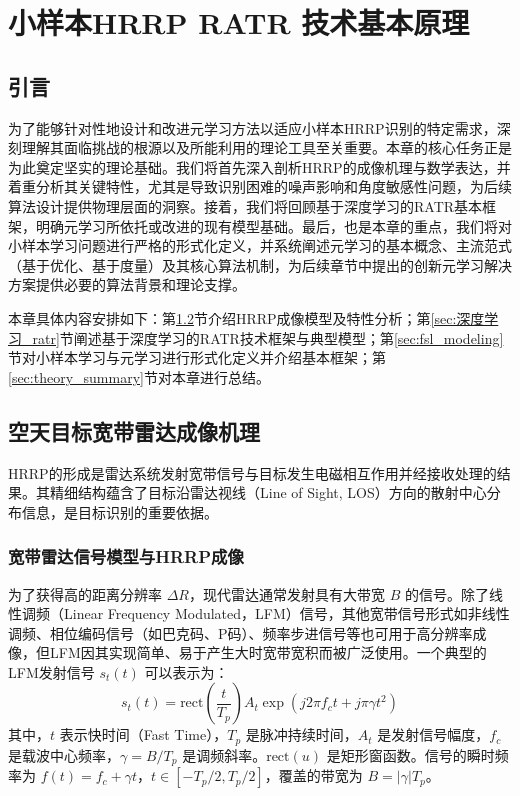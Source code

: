 \chapter{小样本HRRP RATR 技术基本原理}
\label{chap:theory}

\section{引言}
\label{sec:theory_intro}

为了能够针对性地设计和改进元学习方法以适应小样本HRRP识别的特定需求，深刻理解其面临挑战的根源以及所能利用的理论工具至关重要。本章的核心任务正是为此奠定坚实的理论基础。我们将首先深入剖析HRRP的成像机理与数学表达，并着重分析其关键特性，尤其是导致识别困难的噪声影响和角度敏感性问题，为后续算法设计提供物理层面的洞察。接着，我们将回顾基于深度学习的RATR基本框架，明确元学习所依托或改进的现有模型基础。最后，也是本章的重点，我们将对小样本学习问题进行严格的形式化定义，并系统阐述元学习的基本概念、主流范式（基于优化、基于度量）及其核心算法机制，为后续章节中提出的创新元学习解决方案提供必要的算法背景和理论支撑。

本章具体内容安排如下：第\ref{sec:hrrp_mechanism}节介绍HRRP成像模型及特性分析；第\ref{sec:深度学习_ratr}节阐述基于深度学习的RATR技术框架与典型模型；第\ref{sec:fsl_modeling}节对小样本学习与元学习进行形式化定义并介绍基本框架；第\ref{sec:theory_summary}节对本章进行总结。

\section{空天目标宽带雷达成像机理}
\label{sec:hrrp_mechanism}

HRRP的形成是雷达系统发射宽带信号与目标发生电磁相互作用并经接收处理的结果。其精细结构蕴含了目标沿雷达视线（Line of Sight, LOS）方向的散射中心分布信息，是目标识别的重要依据。

\subsection{宽带雷达信号模型与HRRP成像}
\label{subsec:hrrp_imaging_model}

为了获得高的距离分辨率 $\Delta R$，现代雷达通常发射具有大带宽 $B$ 的信号。除了线性调频（Linear Frequency Modulated，LFM）信号，其他宽带信号形式如非线性调频、相位编码信号（如巴克码、P码）、频率步进信号等也可用于高分辨率成像，但LFM因其实现简单、易于产生大时宽带宽积而被广泛使用。一个典型的LFM发射信号 $s_t(t)$ 可以表示为：
\begin{equation}
    s_t(t) = \text{rect}\left(\frac{t}{T_p}\right) A_t \exp\left(j 2\pi f_c t + j \pi \gamma t^2\right)
    \label{eq:lfm_signal}
\end{equation}
其中，$t$ 表示快时间（Fast Time），$T_p$ 是脉冲持续时间，$A_t$ 是发射信号幅度，$f_c$ 是载波中心频率，$\gamma = B / T_p$ 是调频斜率。$\text{rect}(u)$ 是矩形窗函数。信号的瞬时频率为 $f(t) = f_c + \gamma t$，$t \in [-T_p/2, T_p/2]$，覆盖的带宽为 $B = |\gamma| T_p$。

